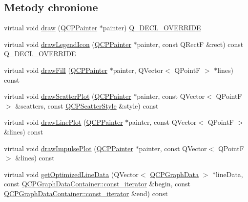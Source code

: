\subsection*{Metody chronione}
\begin{DoxyCompactItemize}
\item 
virtual void \hyperlink{class_q_c_p_graph_a2b0849598f06e834b43ce18cd13bcdc3}{draw} (\hyperlink{class_q_c_p_painter}{Q\+C\+P\+Painter} $\ast$painter) \hyperlink{qcustomplot_8hh_a42cc5eaeb25b85f8b52d2a4b94c56f55}{Q\+\_\+\+D\+E\+C\+L\+\_\+\+O\+V\+E\+R\+R\+I\+DE}
\item 
virtual void \hyperlink{class_q_c_p_graph_a6efbab06c400bdb15e28b2d0a4ecc18a}{draw\+Legend\+Icon} (\hyperlink{class_q_c_p_painter}{Q\+C\+P\+Painter} $\ast$painter, const Q\+RectF \&rect) const \hyperlink{qcustomplot_8hh_a42cc5eaeb25b85f8b52d2a4b94c56f55}{Q\+\_\+\+D\+E\+C\+L\+\_\+\+O\+V\+E\+R\+R\+I\+DE}
\item 
virtual void \hyperlink{class_q_c_p_graph_a81f56135cf16ee23af4e60bdd06a3331}{draw\+Fill} (\hyperlink{class_q_c_p_painter}{Q\+C\+P\+Painter} $\ast$painter, Q\+Vector$<$ Q\+PointF $>$ $\ast$lines) const 
\item 
virtual void \hyperlink{class_q_c_p_graph_a80031550e4809555b7bcbfeb3c7a1b07}{draw\+Scatter\+Plot} (\hyperlink{class_q_c_p_painter}{Q\+C\+P\+Painter} $\ast$painter, const Q\+Vector$<$ Q\+PointF $>$ \&scatters, const \hyperlink{class_q_c_p_scatter_style}{Q\+C\+P\+Scatter\+Style} \&style) const 
\item 
virtual void \hyperlink{class_q_c_p_graph_a731d6e34e4987d1158f861036498bcab}{draw\+Line\+Plot} (\hyperlink{class_q_c_p_painter}{Q\+C\+P\+Painter} $\ast$painter, const Q\+Vector$<$ Q\+PointF $>$ \&lines) const 
\item 
virtual void \hyperlink{class_q_c_p_graph_a1b183c21190ab2beafcd917fbe5f24c8}{draw\+Impulse\+Plot} (\hyperlink{class_q_c_p_painter}{Q\+C\+P\+Painter} $\ast$painter, const Q\+Vector$<$ Q\+PointF $>$ \&lines) const 
\item 
virtual void \hyperlink{class_q_c_p_graph_a888f1f7b6cd598c7f30bd812f30ebe89}{get\+Optimized\+Line\+Data} (Q\+Vector$<$ \hyperlink{class_q_c_p_graph_data}{Q\+C\+P\+Graph\+Data} $>$ $\ast$line\+Data, const \hyperlink{class_q_c_p_data_container_ae40a91f5cb0bcac61d727427449b7d15}{Q\+C\+P\+Graph\+Data\+Container\+::const\+\_\+iterator} \&begin, const \hyperlink{class_q_c_p_data_container_ae40a91f5cb0bcac61d727427449b7d15}{Q\+C\+P\+Graph\+Data\+Container\+::const\+\_\+iterator} \&end) const 
\item 

\end{DoxyCompactItemize}
